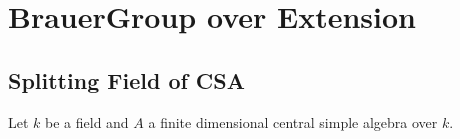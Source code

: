 \chapter{BrauerGroup over Extension}

\section{Splitting Field of CSA}
Let $k$ be a field and $A$ a finite dimensional central simple algebra over $k$. 
